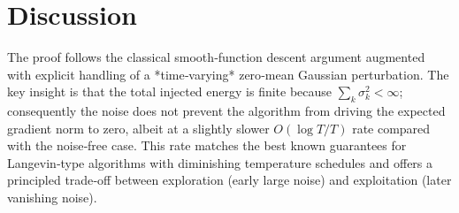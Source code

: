 \documentclass{article}
\begin{document}
\section*{Discussion}
The proof follows the classical smooth‑function descent argument
augmented with explicit handling of a *time‑varying* zero‑mean Gaussian
perturbation.  The key insight is that the total injected energy is
finite because $\sum_{k}\sigma_{k}^{2}<\infty$; consequently the noise does
not prevent the algorithm from driving the expected gradient norm to
zero, albeit at a slightly slower $O(\log T/T)$ rate compared with the
noise‑free case.  This rate matches the best known guarantees for
Langevin‑type algorithms with diminishing temperature schedules and
offers a principled trade‑off between exploration (early large noise)
and exploitation (later vanishing noise).
\end{document}

